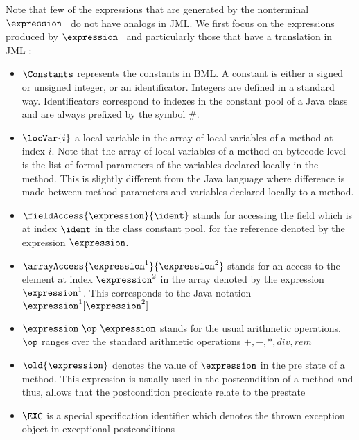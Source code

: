 Note that few of the expressions that are generated by the nonterminal $ \expression$ \  do not have analogs in JML.
 We first focus on the expressions produced by $\expression$ \  and particularly those that have a translation
in JML :


\begin{itemize}
      \item  $ \Constants$ represents the constants in BML. 
             A constant is either a signed or unsigned integer, or an identificator.  
             Integers are defined in a standard way. Identificators correspond 
	     to indexes in the constant pool of a Java class and are always prefixed by the symbol $\#$. 
      
      \item  $ \locVar{i}$ a local variable in the array of local variables of a method at index $i$. Note that the array of local variables of a method on bytecode level
             is the list of formal parameters of the variables declared locally in the method.
             This is slightly different from the Java language where difference is made between method parameters and variables declared locally to a method.	     
     
      \item  $\fieldAccess{ \expression}{\ident}$ stands for accessing the field which is at index $ \ident $  in the class constant pool.
             for the reference denoted by the expression
             $ \expression $. 
	     
	    

      \item  $\arrayAccess{\expression^1} {\expression^2} $ stands for an access to the element at index $ \expression^2$ 
             in the array denoted by the expression $ \expression^1$. This corresponds to the Java notation $\expression^1[\expression^2 ]  $ 

  

      \item  $\expression \ \op \ \expression$ stands for the usual arithmetic operations.
             $\op$ ranges over the standard  arithmetic operations $ + , - , * , div ,  rem $ 

   
      \item $\old{\expression}$  denotes the value of $\expression$ in the pre state of a method. This expression is usually used in the postcondition of a
            method and thus, allows that the postcondition predicate relate to the prestate

      \item $\EXC$ is a special specification identifier which denotes the thrown exception object in exceptional postconditions
 \end{itemize}

